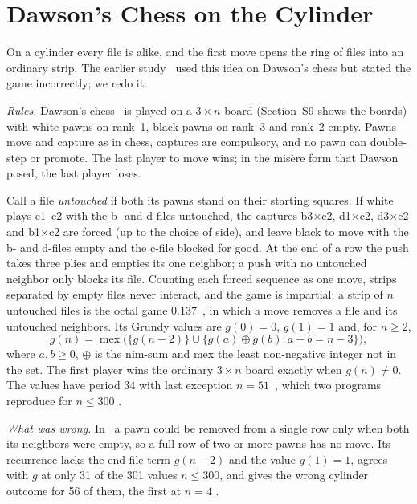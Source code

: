 \section{Dawson's Chess on the Cylinder}\label{sec:dawson}

On a cylinder every file is alike, and the first move opens the ring of files into an ordinary strip. The
earlier study~\cite{Study2025} used this idea on Dawson's chess but stated the game incorrectly; we
redo it.



\emph{Rules.} Dawson's chess~\cite{Dawson1935} is played on a $3\times n$ board
(Section~S9 shows the boards) with white pawns on rank~1, black pawns on rank~3 and rank~2 empty. Pawns move
and capture as in chess, captures are compulsory, and no pawn can double-step or promote. The last player to
move wins; in the mis\`ere form that Dawson posed, the last player loses.

Call a file \emph{untouched} if both its pawns stand on their starting squares. If white plays c1--c2 with the
b- and d-files untouched, the captures b3$\times$c2, d1$\times$c2, d3$\times$c2 and b1$\times$c2 are forced
(up to the choice of side), and leave black to move with the b- and d-files empty and the c-file blocked for
good. At the end of a row the push takes three plies and empties its one neighbor; a push with no untouched
neighbor only blocks its file. Counting each forced sequence as one move, strips separated by empty files never interact,
and the game is impartial: a strip of $n$ untouched files is the octal game
$\mathbf{0.137}$~\cite{GuySmith1956,WinningWays}, in which a move removes a file and its untouched neighbors. Its
Grundy values are $g(0)=0$, $g(1)=1$ and, for $n\ge2$,
\begin{equation}\label{eq:dawson}
g(n)=\operatorname{mex}\bigl(\{g(n-2)\}\cup\{g(a)\oplus g(b) : a+b=n-3\}\bigr),
\end{equation}
where $a,b\ge0$, $\oplus$ is the nim-sum and mex the least non-negative integer not in the set. The first
player wins the ordinary $3\times n$ board exactly when $g(n)\ne0$. The values have period 34 with last exception
$n=51$~\cite{GuySmith1956}, which two programs reproduce for $n\le300$ .

\emph{What was wrong.} In~\cite{Study2025} a pawn could be removed from a single row only when both its
neighbors were empty, so a full row of two or more pawns has no move. Its recurrence lacks the end-file term
$g(n-2)$ and the value $g(1)=1$, agrees with $g$ at only 31 of the 301 values $n\le300$, and gives the wrong
cylinder outcome for 56 of them, the first at $n=4$ .

